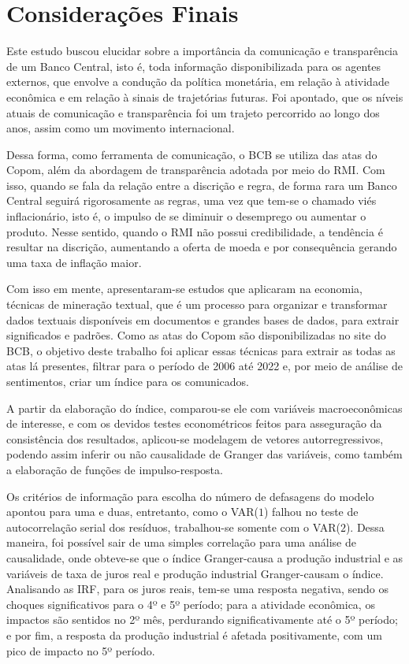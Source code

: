 
\chapter{Considerações Finais}

Este estudo buscou elucidar sobre a importância da comunicação e transparência de um Banco Central, isto é, toda informação disponibilizada para os agentes externos, que envolve a condução da política monetária, em relação à atividade econômica e em relação à sinais de trajetórias futuras. Foi apontado, que os níveis atuais de comunicação e transparência foi um trajeto percorrido ao longo dos anos, assim como um movimento internacional.

Dessa forma, como ferramenta de comunicação, o BCB se utiliza das atas do Copom, além da abordagem de transparência adotada por meio do RMI. Com isso, quando se fala da relação entre a discrição e regra, de forma rara um Banco Central seguirá rigorosamente as regras, uma vez que tem-se o chamado viés inflacionário, isto é, o impulso de se diminuir o desemprego ou aumentar o produto. Nesse sentido, quando o RMI não possui credibilidade, a tendência é resultar na discrição, aumentando a oferta de moeda e por consequência gerando uma taxa de inflação maior.

Com isso em mente, apresentaram-se estudos que aplicaram na economia, técnicas de mineração textual, que é um processo para organizar e transformar dados textuais disponíveis em documentos e grandes bases de dados, para extrair significados e padrões. Como as atas do Copom são disponibilizadas no site do BCB, o objetivo deste trabalho foi aplicar essas técnicas para extrair as todas as atas lá presentes, filtrar para o período de 2006 até 2022 e, por meio de análise de sentimentos, criar um índice para os comunicados.

A partir da elaboração do índice, comparou-se ele com variáveis macroeconômicas de interesse, e com os devidos testes econométricos feitos para asseguração da consistência dos resultados, aplicou-se modelagem de vetores autorregressivos, podendo assim inferir ou não causalidade de Granger das variáveis, como também a elaboração de funções de impulso-resposta.

Os critérios de informação para escolha do número de defasagens do modelo apontou para uma e duas, entretanto, como o VAR($1$) falhou no teste de autocorrelação serial dos resíduos, trabalhou-se somente com o VAR($2$). Dessa maneira, foi possível sair de uma simples correlação para uma análise de causalidade, onde obteve-se que o índice Granger-causa a produção industrial e as variáveis de taxa de juros real e produção industrial Granger-causam o índice. Analisando as IRF, para os juros reais, tem-se uma resposta negativa, sendo os choques significativos para o 4º e 5º período; para a atividade econômica, os impactos são sentidos no 2º mês, perdurando significativamente até o 5º período; e por fim, a resposta da produção industrial é afetada positivamente, com um pico de impacto no 5º período.


